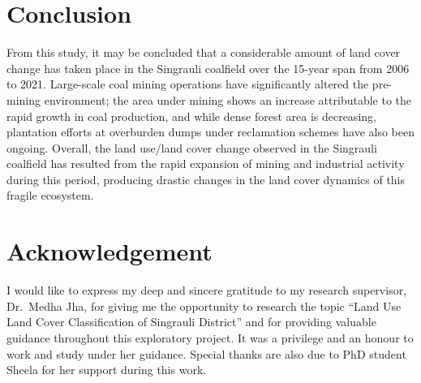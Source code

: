 \documentclass[11pt]{article}
\begin{document}
\section{Conclusion}

From this study, it may be concluded that a considerable amount of land cover change has taken
place in the Singrauli coalfield over the 15-year span from 2006 to 2021. Large-scale coal
mining operations have significantly altered the pre-mining environment; the area under mining
shows an increase attributable to the rapid growth in coal production, and while dense forest
area is decreasing, plantation efforts at overburden dumps under reclamation schemes have also
been ongoing. Overall, the land use/land cover change observed in the Singrauli coalfield has
resulted from the rapid expansion of mining and industrial activity during this period,
producing drastic changes in the land cover dynamics of this fragile ecosystem.

\section*{Acknowledgement}

I would like to express my deep and sincere gratitude to my research supervisor, Dr.\ Medha Jha,
for giving me the opportunity to research the topic ``Land Use Land Cover Classification of
Singrauli District'' and for providing valuable guidance throughout this exploratory project. It
was a privilege and an honour to work and study under her guidance. Special thanks are also due
to PhD student Sheela for her support during this work.
\end{document}
